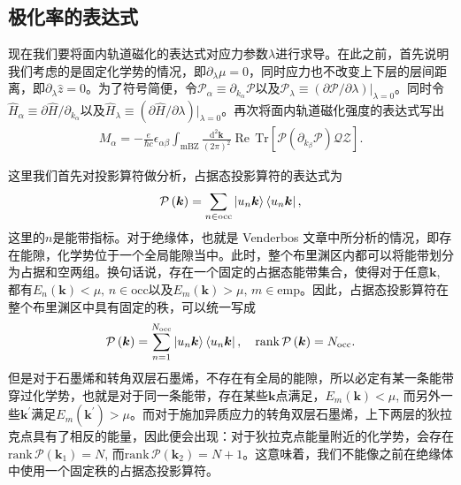 \documentclass[10pt, oneside]{article}
\begin{document}
\subsection{极化率的表达式}
现在我们要将面内轨道磁化的表达式对应力参数\(\lambda\)进行求导。在此之前，首先说明我们考虑的是固定化学势的情况，即\(\partial_{\lambda} \mu = 0\)，同时应力也不改变上下层的层间距离，即\(\partial_{\lambda} \hat{z} = 0\)。为了符号简便，令\(\mathcal{P}_{\alpha} \equiv \partial_{k_{\alpha}} \mathcal{P }\)以及\(\mathcal{P}_{\lambda} \equiv \left(\partial \mathcal{P} / \partial \lambda \right)|_{\lambda = 0}\)。同时令\(\hat{H}_{\alpha} \equiv \partial \hat{H} / \partial_{k_{\alpha}}\)以及\(\hat{H}_{\lambda} \equiv \left(\partial \hat{H} / \partial \lambda\right)|_{\lambda = 0} \)。再次将面内轨道磁化强度的表达式写出
\begin{align}
		\boxed{
		M_{\alpha} = -\frac{e }{\hbar c } \epsilon_{\alpha \beta} \int_{\mathrm{mBZ }} \frac{\mathrm{d}^{2} \bm{k}}{\left(2 \pi\right)^2} \operatorname{Re} \, \mathrm{Tr} \left[\mathcal{P} \left(\partial_{k_{\beta}} \mathcal{P} \right) \mathcal{Q} \mathcal{Z}\right].
	}
\end{align}

这里我们首先对投影算符做分析，占据态投影算符的表达式为
\begin{align*}
	\mathcal{P} \left(\bm{k}\right) = \sum_{n \in \mathrm{occ}} \ket{u_{n } \bm{k}} \bra{u_{n} \bm{k}},
\end{align*}
这里的\(n\)是能带指标。对于绝缘体，也就是 Venderbos 文章中所分析的情况，即存在能隙，化学势位于一个全局能隙当中。此时，整个布里渊区内都可以将能带划分为占据和空两组。换句话说，存在一个固定的占据态能带集合，使得对于任意\(\bm{k }\), 都有\(E_{n } \left(\bm{k }\right) < \mu, \, n \in \mathrm{occ}\)以及\(E_{m } \left(\bm{k }\right) > \mu, \, m \in \mathrm{emp}\)。因此，占据态投影算符在整个布里渊区中具有固定的秩，可以统一写成
\begin{align*}
	\mathcal{P} \left(\bm{k}\right) = \sum_{n = 1}^{N_{\mathrm{occ}}}  \ket{u_{n } \bm{k}} \bra{u_{n} \bm{k}}, \quad \mathrm{rank} \, \mathcal{P} \left(\bm{k}\right) = N_{\mathrm{occ}}.
\end{align*}
但是对于石墨烯和转角双层石墨烯，不存在有全局的能隙，所以必定有某一条能带穿过化学势，也就是对于同一条能带，存在某些\(\bm{k }\)点满足，\(E_{m } \left(\bm{k }\right) < \mu\), 而另外一些\(\bm{k}^{\prime}\)满足\(E_{m} \left(\bm{k}^{\prime}\right)> \mu\)。而对于施加异质应力的转角双层石墨烯，上下两层的狄拉克点具有了相反的能量，因此便会出现：对于狄拉克点能量附近的化学势，会存在\(\mathrm{rank} \, \mathcal{P} \left(\bm{k}_{1}\right) = N\), 而\(\mathrm{rank} \, \mathcal{P} \left(\bm{k}_{2}\right) = N + 1\)。这意味着，我们不能像之前在绝缘体中使用一个固定秩的占据态投影算符。
\end{document}
